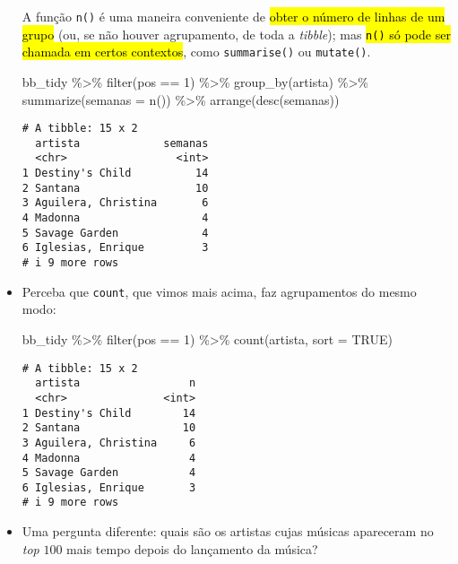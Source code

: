 \documentclass[
  letterpaper,
  DIV=11,
  numbers=noendperiod]{scrreprt}
\newenvironment{Shaded}{\begin{snugshade}}{\end{snugshade}}
\newcommand{\AttributeTok}[1]{\textcolor[rgb]{0.40,0.45,0.13}{#1}}
\newcommand{\ConstantTok}[1]{\textcolor[rgb]{0.56,0.35,0.01}{#1}}
\newcommand{\DecValTok}[1]{\textcolor[rgb]{0.68,0.00,0.00}{#1}}
\newcommand{\FunctionTok}[1]{\textcolor[rgb]{0.28,0.35,0.67}{#1}}
\newcommand{\NormalTok}[1]{\textcolor[rgb]{0.00,0.23,0.31}{#1}}
\newcommand{\SpecialCharTok}[1]{\textcolor[rgb]{0.37,0.37,0.37}{#1}}
\begin{document}
\begin{itemize}
  A função \texttt{n()} é uma maneira conveniente de {\hl{obter o número
  de linhas de um grupo}} (ou, se não houver agrupamento, de toda a
  \emph{tibble}); mas {\hl{{\mbox{\texttt{n()}}} só pode ser chamada em
  certos contextos}}, como \texttt{summarise()} ou \texttt{mutate()}.

\begin{Shaded}
\begin{Highlighting}[]
\NormalTok{bb\_tidy }\SpecialCharTok{\%\textgreater{}\%} 
  \FunctionTok{filter}\NormalTok{(pos }\SpecialCharTok{==} \DecValTok{1}\NormalTok{) }\SpecialCharTok{\%\textgreater{}\%} 
  \FunctionTok{group\_by}\NormalTok{(artista) }\SpecialCharTok{\%\textgreater{}\%}
  \FunctionTok{summarize}\NormalTok{(}\AttributeTok{semanas =} \FunctionTok{n}\NormalTok{()) }\SpecialCharTok{\%\textgreater{}\%} 
  \FunctionTok{arrange}\NormalTok{(}\FunctionTok{desc}\NormalTok{(semanas))}
\end{Highlighting}
\end{Shaded}

\begin{verbatim}
# A tibble: 15 x 2
  artista             semanas
  <chr>                 <int>
1 Destiny's Child          14
2 Santana                  10
3 Aguilera, Christina       6
4 Madonna                   4
5 Savage Garden             4
6 Iglesias, Enrique         3
# i 9 more rows
\end{verbatim}
\item
  Perceba que \texttt{count}, que vimos mais acima, faz agrupamentos do
  mesmo modo:

\begin{Shaded}
\begin{Highlighting}[]
\NormalTok{bb\_tidy }\SpecialCharTok{\%\textgreater{}\%} 
  \FunctionTok{filter}\NormalTok{(pos }\SpecialCharTok{==} \DecValTok{1}\NormalTok{) }\SpecialCharTok{\%\textgreater{}\%} 
  \FunctionTok{count}\NormalTok{(artista, }\AttributeTok{sort =} \ConstantTok{TRUE}\NormalTok{)}
\end{Highlighting}
\end{Shaded}

\begin{verbatim}
# A tibble: 15 x 2
  artista                 n
  <chr>               <int>
1 Destiny's Child        14
2 Santana                10
3 Aguilera, Christina     6
4 Madonna                 4
5 Savage Garden           4
6 Iglesias, Enrique       3
# i 9 more rows
\end{verbatim}
\item
  Uma pergunta diferente: quais são os artistas cujas músicas apareceram
  no \emph{top} $100$ mais tempo depois do lançamento da música?


\end{itemize}
\end{document}
